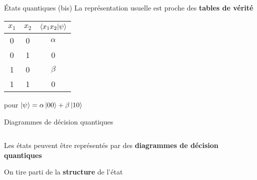 \begin{frame}{États quantiques (bis)}
    La représentation usuelle est proche des \textbf{tables de vérité}
    \begin{center}
        \begin{tabular}{c|c|c}
            $x_1$ & $x_2$ & $\braket{x_1 x_2|\psi}$ \\
            \hline
            0 & 0 & $\alpha$ \\
            0 & 1 & 0        \\
            1 & 0 & $\beta$  \\
            1 & 1 & 0
        \end{tabular}

        \vspace{1em}
        \small{pour $\ket \psi = \alpha \ket {00} + \beta \ket {10}$}
    \end{center}
\end{frame}

\begin{frame}{Diagrammes de décision quantiques}
    \begin{columns}
        \begin{column}{0.7\textwidth}
            Les états peuvent être représentés par des \textbf{diagrammes de décision quantiques}

            \vspace{1em}

            On tire parti de la \textbf{structure} de l'état
        \end{column}
        \begin{column}{0.3\textwidth}
        \end{column}
    \end{columns}
\end{frame}

